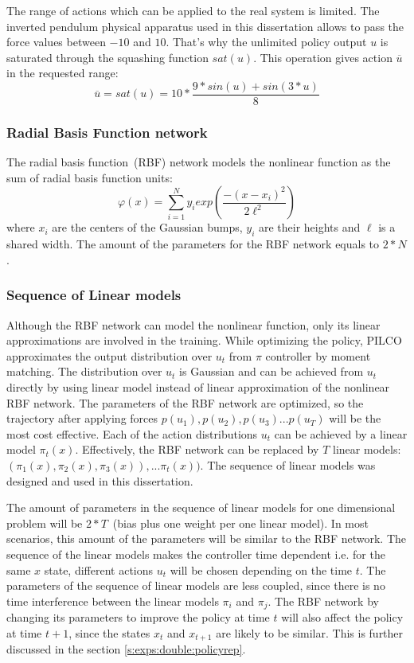 \noindent The range of actions which can be applied to the real system is limited. The inverted pendulum physical apparatus used in this dissertation allows to pass the force values between $-10$ and $10$. That's why the unlimited policy output $u$ is saturated through the squashing function $sat(u)$. This operation gives action $\overline{u}$ in the requested range:
\begin{equation}
\overline{u} = sat(u) = 10 * \frac{9 * sin(u) + sin (3 * u)}{8}
\end{equation}

\subsubsection{Radial Basis Function network}
\label{s:pilco:rbf}
The radial basis function\ (RBF) network models the nonlinear function as the sum of radial basis function units:
\begin{equation}
\varphi(x) = \sum_{i=1}^{N} y_{i} exp (\frac{-(x-x_{i})^2}{2 \ell^2})
\end{equation}
where $x_{i}$ are the centers of the Gaussian bumps, $y_{i}$ are their heights and $\ell$ is a shared width. The amount of the parameters for the RBF network equals to $2*N$.

\subsubsection{Sequence of Linear models}
\label{s:pilco:seqlin}
Although the RBF network can model the nonlinear function, only its linear approximations are involved in the training. While optimizing the policy, PILCO approximates the output distribution over $u_{t}$ from $\pi$ controller by moment matching. The distribution over $u_{t}$ is Gaussian and can be achieved from $u_{t}$ directly by using linear model instead of linear approximation of the nonlinear RBF network. The parameters of the RBF network are optimized, so the trajectory after applying forces $p(u_{1}), p(u_{2}), p(u_{3})...p(u_{T})$ will be the most cost effective. Each of the action distributions $u_{t}$ can be achieved by a linear model $\pi_{t}(x)$.  Effectively, the RBF network can be replaced by $T$ linear models: $(\pi_{1}(x), \pi_{2}(x), \pi_{3}(x)),...\pi_{t}(x))$. The sequence of linear models was designed and used in this dissertation.

\noindent The amount of parameters in the sequence of linear models for one dimensional problem will be $2*T$\ (bias plus one weight per one linear model). In most scenarios, this amount of the parameters will be similar to the RBF network. The sequence of the linear models makes the controller time dependent i.e. for the same $x$ state, different actions $u_{t}$ will be chosen depending on the time $t$. The parameters of the sequence of linear models are less coupled, since there is no time interference between the linear models $\pi_{i}$ and $\pi_{j}$. The RBF network by changing its parameters to improve the policy at time $t$ will also affect the policy at time $t+1$, since the states $x_{t}$ and $x_{t+1}$ are likely to be similar. This is further discussed in the section \ref{s:exps:double:policyrep}.

